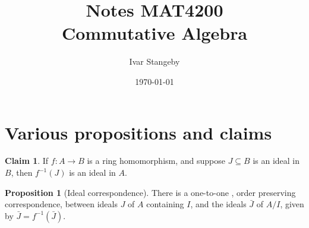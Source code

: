 \documentclass{article}
\title{Notes MAT4200 \\
Commutative Algebra}
\author{Ivar Stangeby}
\date{\today}
\theoremstyle{definition}
\newtheorem{prop}{Proposition}
\newtheorem{claim}{Claim}
\begin{document}
\maketitle

\section{Various propositions and claims}
\label{sec:various_propositions_and_claims}

\begin{claim}
	\label{clm:inverse_ideal} If $f\colon A \to B$ is a ring
	homomorphism, and suppose $J \subseteq B$ is an ideal in $B$, then
	$f^{-1}\left( J \right)$ is an ideal in $A$.			
\end{claim}
\begin{prop}[Ideal correspondence]
	There is a one-to-one , order preserving correspondence, between
	ideals $J$ of $A$ containing $I$, and the ideals $\bar{J}$ of $A /
	I$, given by $\bar{J} = f^{-1}\left( \bar{J} \right)$.
\end{prop}
\end{document}
